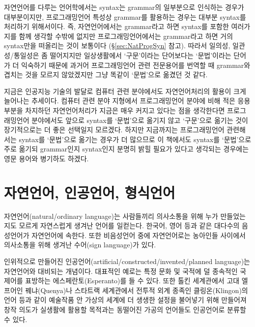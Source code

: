 \documentclass[b5paper,chapter,figtabcapt]{oblivoir}
\begin{document}
자연언어를 다루는 언어학에서는 syntax는 grammar의 일부분으로 인식하는 경우가
대부분이지만, 프로그래밍언어 특성상 grammar를 활용하는 경우는 대부분
syntax를 처리하기 위해서이다. 즉, 자연언어에서는 grammar라고 하면 syntax를
포함한 여러가지를 함께 생각할 수밖에 없지만 프로그래밍언어에서는 grammar라고
하면 거의 syntax만을 떠올리는 것이 보통이다 (\S\ref{sec:NatProgSyn} 참고).
따라서 일의성, 일관성/통일성은 좀 떨어지지만 일상생활에서 `구문'이라는
단어보다는 `문법'이라는 단어가 더 익숙하기 때문에 과거어 프로그래밍언어 관련
전문용어를 번역할 때 grammar와 겹치는 것을 모르지 않았겠지만 그냥 똑같이
`문법'으로 옮겼던 것 같다.

지금은 인공지능 기술의 발달로 컴퓨터 관련 분야에서도 자연언어처리의 활용이
크게 늘어나는 추세이다. 컴퓨터 관련 분야 지형에서 프로그래밍언어 분야에 비해
적은 응용 부분을 차지하던 자연언어처리가 지금은 매우 커지고 있다는 점을
생각한다면 프로그래밍언어 분야에서도 앞으로 syntax를 `문법'으로 옮기지 않고
`구문'으로 옮기는 것이 장기적으로는 더 좋은 선택일지 모르겠다. 하지만
지금까지는 프로그래밍언어 관련해서는 syntax를 `문법'으로 옮기는 경우가 더
많으므로 이 책에서도 syntax를 `문법'으로 주로 옮기되 grammar인지 syntax인지
분명히 밝힐 필요가 있다고 생각되는 경우에는 영문 용어와 병기하도 하겠다.

\section{자연언어, 인공언어, 형식언어}

자연언어(natural/ordinary language)는 사람들끼리 의사소통을 위해 누가 만들었는지도 모르게
자연스럽게 생겨난 언어를 일컫는다. 한국어, 영어 등과 같은 대다수의 음성언어가
자연언어에 속한다. 또한 비음성언어 중에 자연언어로는 농아인들 사이에서 의사소통을
위해 생겨난 수어(sign language)가 있다.

인위적으로 만들어진 인공언어(artificial/constructed/invented/planned language)는
자연언어와 대비되는 개념이다. 대표적인 예로는 특정 문화 및 국적에 덜 종속적인
국제어를 표방하는 에스페란토(Esperanto)를 들 수 있다. 또한 톨킨 세계관에서
고대 엘프어인 꿰냐(Quenya)나 스타트랙 세계관에서 전투적 외계 종족인 클링온(Klingon)의
언어 등과 같이 예술작품 안 가상의 세계에 더 생생한 설정을 불어넣기 위해 만들어져
창작 의도가 실생활에 활용할 목적과는 동떨어진 가공의 언어들도 인공언어로 분류할 수 있다.
\end{document}
